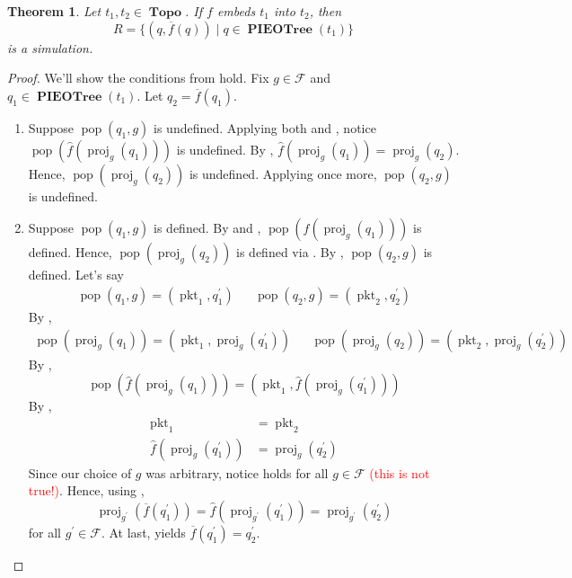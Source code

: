 \documentclass{amsart}
\DeclareMathOperator{\pkt}{\mathrm{pkt}}
\DeclareMathOperator{\pop}{\mathrm{pop}}
\DeclareMathOperator{\proj}{\mathrm{proj}}
\DeclareMathOperator{\Topo}{\mathbf{Topo}}
\DeclareMathOperator{\PIEOTree}{\mathbf{PIEOTree}}
\newtheorem{thm}{Theorem}[section]
\theoremstyle{definition}
\begin{document}
\begin{thm}
    Let $t_1, t_2 \in \Topo$. If $f$ embeds $t_1$ into $t_2$, then 
    $$R = \{(q, \overline{f}(q)) \mid q \in \PIEOTree(t_1)\}$$ 
    is a simulation.
\end{thm}

\begin{proof}
    We'll show the conditions from  hold.
    Fix $g \in \mathcal F$ and $q_1 \in \PIEOTree(t_1)$.
    Let $q_2 = \overline{f}(q_1)$.
    \begin{enumerate}
        \item Suppose $\pop(q_1, g)$ is undefined. 
            Applying both  and \cite[Lemma ~5.6]{OG}, notice $\pop(\widehat{f}(\proj_g(q_1)))$ is undefined.
            By , $\widehat{f}(\proj_g(q_1)) = \proj_g(q_2)$.
            Hence, $\pop(\proj_g(q_2))$ is undefined.
            Applying  once more, $\pop(q_2, g)$ is undefined.

        \item Suppose $\pop(q_1, g)$ is defined. 
            By  and \cite[Lemma ~5.6]{OG}, $\pop(\widehat{f}(\proj_g(q_1)))$ is defined.
            Hence, $\pop(\proj_g(q_2))$ is defined via .
            By , $\pop(q_2, g)$ is defined.
            Let's say 
            \begin{align*}
                \pop(q_1, g) = (\pkt_1, q_1^\prime) && \pop(q_2, g) = (\pkt_2, q_2^\prime)
            \end{align*}
            By , 
            \begin{align*}
                \pop(\proj_g(q_1)) = (\pkt_1, \proj_g(q_1^\prime)) 
                &&
                \pop(\proj_g(q_2)) = (\pkt_2, \proj_g(q_2^\prime))
            \end{align*}
            By \cite[Lemma ~5.7]{OG},
            $$\pop(\widehat{f}(\proj_g(q_1))) = (\pkt_1, \widehat{f}(\proj_g(q_1^\prime)))$$
            By ,
            \begin{align*}
                \pkt_1 &= \pkt_2\\
                \widehat{f}(\proj_g(q_1^\prime)) &= \proj_g(q_2^\prime) \label{eq:popsim} \tag{$\dagger$} 
            \end{align*}
            Since our choice of $g$ was arbitrary, notice  holds for all $g \in \mathcal F$ \textcolor{red}{(this is not true!)}.
            Hence, using ,
            $$\proj_{g^\prime}(\overline{f}(q_1^\prime)) = \widehat{f}(\proj_{g^\prime}(q_1^\prime)) = \proj_{g^\prime}(q_2^\prime)$$
            for all $g^\prime \in \mathcal F$. 
            At last,  yields $\overline{f}(q_1^\prime) = q_2^\prime$. 
        

\end{enumerate}
\end{proof}
\end{document}
